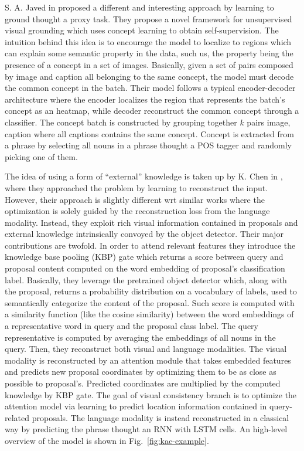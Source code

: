 S. A. Javed \etal{} in \cite{javed2018learning} proposed a different
and interesting approach by learning to ground thought a proxy task.
They propose a novel framework for unsupervised visual grounding which
uses concept learning to obtain self-supervision. The intuition behind
this idea is to encourage the model to localize to regions which can
explain some semantic property in the data, such us, the property
being the presence of a concept in a set of images. Basically, given a
set of pairs composed by image and caption all belonging to the same
concept, the model must decode the common concept in the batch. Their
model follows a typical encoder-decoder architecture where the encoder
localizes the region that represents the batch's concept as an
heatmap, while decoder reconstruct the common concept through a
classifier. The concept batch is constructed by grouping together $k$
pairs image, caption where all captions contains the same concept.
Concept is extracted from a phrase by selecting all nouns in a phrase
thought a POS tagger and randomly picking one of them.

The idea of using a form of ``external'' knowledge is taken up by K.
Chen \etal{} in \cite{chen2018knowledge}, where they approached the
problem by learning to reconstruct the input. However, their approach
is slightly different wrt similar works where the optimization is
solely guided by the reconstruction loss from the language modality.
Instead, they exploit rich visual information contained in proposals
and external knowledge intrinsically convoyed by the object detector.
Their major contributions are twofold. In order to attend relevant
features they introduce the knowledge base pooling (KBP) gate which
returns a score between query and proposal content computed on the
word embedding of proposal's classification label. Basically, they
leverage the pretrained object detector which, along with the
proposal, returns a probability distribution on a vocabulary of
labels, used to semantically categorize the content of the proposal.
Such score is computed with a similarity function (like the cosine
similarity) between the word embeddings of a representative word in
query and the proposal class label. The query representative is
computed by averaging the embeddings of all nouns in the query. Then,
they reconstruct both visual and language modalities. The visual
modality is reconstructed by an attention module that takes embedded
features and predicts new proposal coordinates by optimizing them to
be as close as possible to proposal's. Predicted coordinates are
multiplied by the computed knowledge by KBP gate. The goal of visual
consistency branch is to optimize the attention model via learning to
predict location information contained in query-related proposals. The
language modality is instead reconstructed in a classical way by
predicting the phrase thought an RNN with LSTM cells. An high-level
overview of the model is shown in Fig.~\ref{fig:kac-example}.

